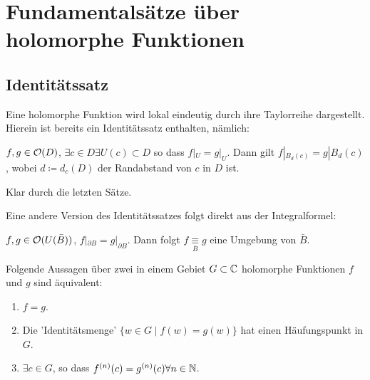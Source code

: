 \chapter{Fundamentals\"atze \"uber holomorphe Funktionen}
\section{Identit\"atssatz}
Eine holomorphe Funktion wird lokal eindeutig durch ihre Taylorreihe dargestellt. Hierein ist bereits ein Identit\"atssatz enthalten, n\"amlich:
\begin{satz}[]
	$ f,g\in\mathcal O(D) $, $ \exists c\in D\exists U(c)\subset D $ so dass $ f|_U=g|_U $. Dann gilt $ f|_{B_d(c)}=g|B_d(c) $, wobei $ d\coloneqq d_c(D) $ der Randabstand von $ c $ in $ D $ ist.
\end{satz}
\begin{beweis}
	Klar durch die letzten S\"atze.
\end{beweis}
Eine andere Version des Identit\"atssatzes folgt direkt aus der Integralformel:
\begin{satz}
	$ f,g\in\mathcal O(U(\bar B)) $, $ f|_{\partial B}=g|_{\partial B} $. Dann folgt $ f\underset{\bar B}{\equiv}g $ eine Umgebung von $ \bar B $.
\end{satz}
\newpage
\begin{satz}
	Folgende Aussagen \"uber zwei in einem Gebiet $ G\subset\mathbb{C} $ holomorphe Funktionen $ f $ und $ g $ sind \"aquivalent:
	\begin{enumerate}
		\item $ f=g $.
		\item Die 'Identit\"atsmenge' $ \lbrace w\in G\mid f(w)=g(w)\rbrace $ hat einen H\"aufungspunkt in $ G $.
		\item $ \exists c\in G $, so dass $ f^{(n)}(c)=g^{(n)}(c)\forall n\in\mathbb{N} $.
	\end{enumerate}
\end{satz}
